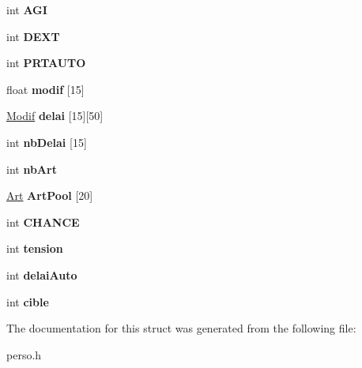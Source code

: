 \begin{DoxyCompactItemize}
int {\bfseries A\+GI}
\item 
\mbox{\label{structPersonnage_a2a2a400212319d366f7f9efe1021b85f}} 
int {\bfseries D\+E\+XT}
\item 
\mbox{\label{structPersonnage_aaba12ad5e91cc2302d2f439021bca5f9}} 
int {\bfseries P\+R\+T\+A\+U\+TO}
\item 
\mbox{\label{structPersonnage_a46d84c7e1ef8751066d0b2501bde5bc6}} 
float {\bfseries modif} \mbox{[}15\mbox{]}
\item 
\mbox{\label{structPersonnage_a471eb87a891b635c5098009990240db9}} 
\mbox{\hyperlink{structModif}{Modif}} {\bfseries delai} \mbox{[}15\mbox{]}\mbox{[}50\mbox{]}
\item 
\mbox{\label{structPersonnage_a194b2ba07b5d8d0708e29243dc1a6a08}} 
int {\bfseries nb\+Delai} \mbox{[}15\mbox{]}
\item 
\mbox{\label{structPersonnage_a84a39555fc983441645f43da68ff4b52}} 
int {\bfseries nb\+Art}
\item 
\mbox{\label{structPersonnage_aa2821fb4b9afdb8fb3b73316a7d2a58f}} 
\mbox{\hyperlink{structArt}{Art}} {\bfseries Art\+Pool} \mbox{[}20\mbox{]}
\item 
\mbox{\label{structPersonnage_a35a7fc9170f86d3cc9121319023afe41}} 
int {\bfseries C\+H\+A\+N\+CE}
\item 
\mbox{\label{structPersonnage_aa3e897fdd3f3b9dbec820d4197f544d4}} 
int {\bfseries tension}
\item 
\mbox{\label{structPersonnage_a414d0e5769cc735b655a061465483aa6}} 
int {\bfseries delai\+Auto}
\item 
\mbox{\label{structPersonnage_afdfd15aa4ea01f2b00647c897b208635}} 
int {\bfseries cible}
\end{DoxyCompactItemize}


The documentation for this struct was generated from the following file\+:\begin{DoxyCompactItemize}
\item 
perso.\+h\end{DoxyCompactItemize}
